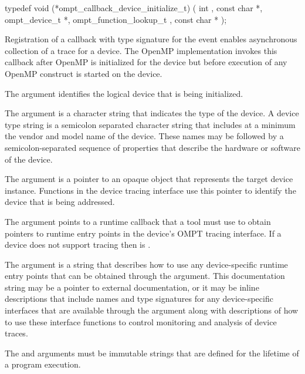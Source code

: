 \format
\begin{ccppspecific}
\begin{omptCallback}
typedef void (*ompt_callback_device_initialize_t) (
  int ,
  const char *,
  ompt_device_t *,
  ompt_function_lookup_t ,
  const char *
);
\end{omptCallback}
\end{ccppspecific}

\descr
Registration of a callback with type signature 
 for the 
 event enables asynchronous 
collection of a trace for a device. The OpenMP implementation invokes 
this callback after OpenMP is initialized for the device but before 
execution of any OpenMP construct is started on the device.

\argdesc
The  argument identifies the logical device that is
being initialized.

The  argument is a character string that indicates the type of 
the device. A device type string is a semicolon separated character string 
that includes at a minimum the vendor and model name of the device. These
names may be followed by a semicolon-separated sequence of properties that 
describe the hardware or software of the device.

The  argument is a pointer to an opaque object that represents 
the target device instance. Functions in the device tracing interface 
use this pointer to identify the device that is being addressed.

The  argument points to a runtime callback that a tool must 
use to obtain pointers to runtime entry points in the device's OMPT tracing 
interface. If a device does not support tracing then  is .

The  argument is a string that describes how to use any 
device-specific runtime entry points that can be obtained through the 
 argument. This documentation string may be a pointer to external
documentation, or it may be inline descriptions that include names and type 
signatures for any device-specific interfaces that are available through the
 argument along with descriptions of how to use these interface 
functions to control monitoring and analysis of device traces.

\constraints
The  and  arguments must be immutable strings 
that are defined for the lifetime of a program execution.


